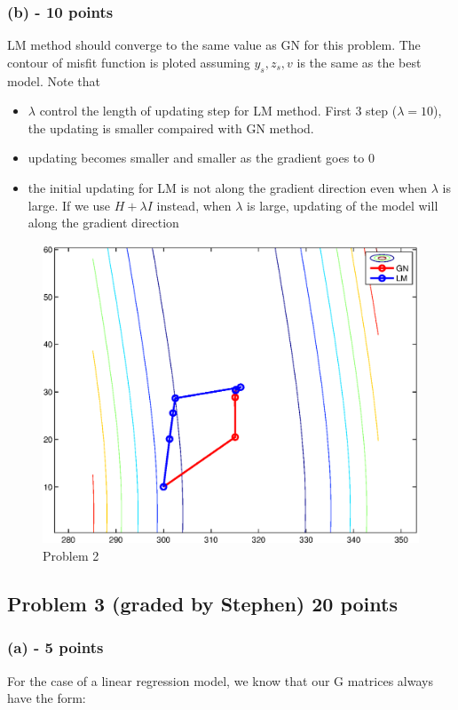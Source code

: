 \documentclass[11pt]{article}
\begin{document}
\subsubsection*{(b) - 10 points}
LM method should converge to the same value as GN for this problem. 
The contour of misfit function is ploted assuming $y_s,z_s,v$ is the same as the best model. Note that
\begin{itemize}
\item $\lambda$ control the length of updating step for LM method. First 3 step ($\lambda=10$), the updating is smaller compaired with GN method. 
\item updating becomes smaller and smaller as the gradient goes to 0
\item the initial updating for LM is not along the gradient direction even when $\lambda$ is large. If we use $H+\lambda I$ instead, when $\lambda$ is large, updating of the model will along the gradient direction
\end{itemize}
\begin{figure}
\includegraphics[width=12cm]{LM.eps}
\caption{Problem 2}
\end{figure}


\subsection*{Problem 3 (graded by Stephen) 20 points}
\subsubsection*{(a) - 5 points}
For the case of a linear regression model, we know that our G matrices always have the form:
\end{document}
